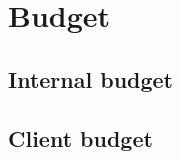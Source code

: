 \renewcommand{\documentname}{Budget}

\chapter{Budget}

\section{Internal budget}
\section{Client budget}

